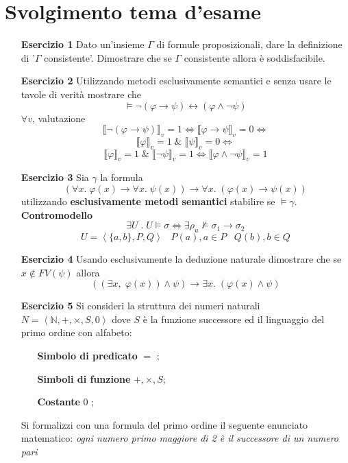 \documentclass{article}
\theoremstyle{break}
\theoremstyle{break}
\theoremstyle{break}
\theoremstyle{break}
\begin{document}
  \section{Svolgimento tema d'esame}
  \begin{enumerate}
    \item [\textbf{Esercizio 1}]
      Dato un'insieme \( \Gamma  \) di formule proposizionali, dare la definizione
      di '\( \Gamma  \) consistente'. Dimostrare che se \( \Gamma  \) consistente allora è
      soddisfacibile.
    \item [\textbf{Esercizio 2}]
      Utilizzando metodi esclusivamente semantici e senza usare le tavole di verità mostrare che
      \[
        \models \neg(\varphi \to \psi ) \leftrightarrow (\varphi \wedge \neg \psi )
      \] 
      \( \forall v \), valutazione
      \[
        \llbracket  \neg(\varphi \to \psi ) \rrbracket_v = 1 \Leftrightarrow \llbracket  \varphi \to \psi \rrbracket_v = 0 \Leftrightarrow
      \] 
      \[
        \llbracket \varphi\rrbracket_v = 1 \;\&\; \llbracket \psi\rrbracket_v = 0 \Leftrightarrow
      \] 
      \[
        \llbracket \varphi\rrbracket_v = 1 \;\&\; \llbracket \neg \psi \rrbracket_v = 1 \Leftrightarrow \llbracket \varphi \wedge \neg \psi\rrbracket_v = 1
      \] 
    \item [\textbf{Esercizio 3}]
      Sia \( \gamma  \) la formula
      \[
        (\forall x.\; \varphi(x) \to \forall x.\;\psi (x)) \to \forall x.\; (\varphi (x) \to \psi(x))
      \] 
      utilizzando \textbf{esclusivamente metodi semantici} stabilire se \( \models \gamma  \). \\
      \textbf{Contromodello} 
      \[
        \exists U\;.\; U \models \sigma  \Leftrightarrow \exists \rho_u \not\models \sigma_1 \to \sigma_2
      \] 
      \[
        U = \left<\{a,b\}, P, Q\right> \;\;\; P(a), a \in P \;\;\; Q(b), b \in Q
      \] 
    \item [\textbf{Esercizio 4}]
      Usando esclusivamente la deduzione naturale dimostrare che se \( x \notin FV(\psi) \) allora
      \[
        ((\exists x,\; \varphi(x)) \wedge \psi) \to \exists x.\; (\varphi(x) \wedge \psi )
      \] 
    \item [\textbf{Esercizio 5}]
      Si consideri la struttura dei numeri naturali \( N = \left< \mathbb{N}, +, \times, S, 0 \right> \) dove
      \( S \) è la funzione successore ed il linguaggio del primo ordine con alfabeto:
      \begin{itemize}
        \item [] \textbf{Simbolo di predicato} \( = \) ;
        \item [] \textbf{Simboli di funzione} \( +, \times, S \);
        \item [] \textbf{Costante} \( 0 \) ;
      \end{itemize}
      Si formalizzi con una formula del primo ordine il seguente enunciato matematico: \emph{ogni numero
      primo maggiore di 2 è il successore di un numero pari}
  \end{enumerate}
  
\end{document}
